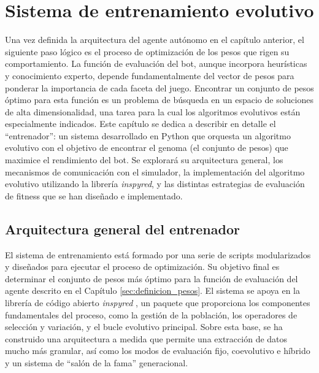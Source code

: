 \chapter{Sistema de entrenamiento evolutivo} \label{chap:entrenador}

Una vez definida la arquitectura del agente autónomo en el capítulo anterior, el siguiente paso lógico es el proceso de optimización de los pesos que rigen su comportamiento. La función de evaluación del bot, aunque incorpora heurísticas y conocimiento experto, depende fundamentalmente del vector de pesos para ponderar la importancia de cada faceta del juego. Encontrar un conjunto de pesos óptimo para esta función es un problema de búsqueda en un espacio de soluciones de alta dimensionalidad, una tarea para la cual los algoritmos evolutivos están especialmente indicados. Este capítulo se dedica a describir en detalle el ``entrenador'': un sistema desarrollado en Python que orquesta un algoritmo evolutivo con el objetivo de encontrar el genoma (el conjunto de pesos) que maximice el rendimiento del bot. Se explorará su arquitectura general, los mecanismos de comunicación con el simulador, la implementación del algoritmo evolutivo utilizando la librería \textit{inspyred}, y las distintas estrategias de evaluación de fitness que se han diseñado e implementado.


\section{Arquitectura general del entrenador} \label{sec:arquitectura_entrenador}

El sistema de entrenamiento está formado por una serie de scripts modularizados y diseñados para ejecutar el proceso de optimización. Su objetivo final es determinar el conjunto de pesos más óptimo para la función de evaluación del agente descrito en el Capítulo \ref{sec:definicion_pesos}. El sistema se apoya en la librería de código abierto \textit{inspyred} \cite{garrett_aarongarrettinspyred_2012}, un paquete que proporciona los componentes fundamentales del proceso, como la gestión de la población, los operadores de selección y variación, y el bucle evolutivo principal. Sobre esta base, se ha construido una arquitectura a medida que permite una extracción de datos mucho más granular, así como los modos de evaluación fijo, coevolutivo e híbrido y un sistema de ``salón de la fama'' generacional.

